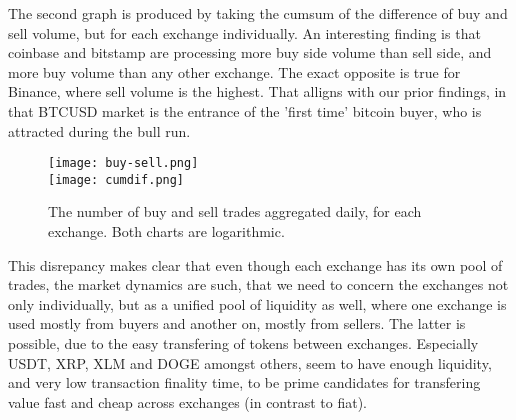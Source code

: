 The second graph is produced by taking the cumsum of the difference of buy and sell volume, but for each exchange individually. An interesting finding is that coinbase and bitstamp are processing more buy side volume than sell side, and more buy volume than any other exchange. The exact opposite is true for Binance, where sell volume is the highest. That alligns with our prior findings, in that BTCUSD market is the entrance of the 'first time' bitcoin buyer, who is attracted during the bull run. 


\begin{figure}[H]
	\centering
    \texttt{[image: buy-sell.png]} \\
    \texttt{[image: cumdif.png]} \\ 
	\caption{The number of buy and sell trades aggregated daily, for each exchange. Both charts are logarithmic.}
    \label{fig:cum}
\end{figure}


This disrepancy makes clear that even though each exchange has its own pool of trades, the market dynamics are such, that we need to concern the exchanges not only individually, but as a unified pool of liquidity as well, where one exchange is used mostly from buyers and another on, mostly from sellers. The latter is possible, due to the easy transfering of tokens between exchanges. Especially USDT, XRP, XLM and DOGE amongst others, seem to have enough liquidity, and very low transaction finality time, to be prime candidates for transfering value fast and cheap across exchanges (in contrast to fiat). 
